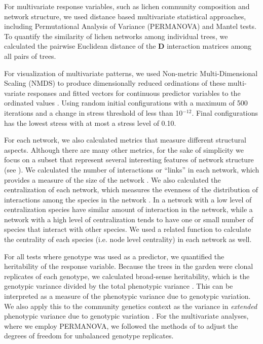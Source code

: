 \documentclass[11pt,twocolumn,twoside,lineno]{pnas-new}
\begin{document}
{For multivariate response variables, such as lichen community
composition and network structure, we used distance based multivariate
statistical approaches, including Permutational Analysis of Variance
(PERMANOVA) and Mantel tests. To quantify the similarity of lichen
networks among individual trees, we calculated the pairwise Euclidean
distance of the $\mathbf{D}$ interaction matrices among all pairs of
trees.

For visualization of multivariate patterns, we used Non-metric
Multi-Dimensional Scaling (NMDS) \cite{ecodist} to produce
dimensionally reduced ordinations of these multi-variate responses and
fitted vectors for continuous predictor variables to the ordinated
values \cite{vegan}. Using random initial configurations with a
maximum of 500 iterations and a change in stress threshold of less
than 10$^{-12}$. Final configurations has the lowest stress with at
most a stress level of 0.10.

For each network, we also calculated metrics that measure different
structural aspects. Although there are many other metrics, for the
sake of simplicity we focus on a subset that represent several
interesting features of network structure (see \citep{Lau2017a}). We
calculated the number of interactions or ``links'' in each network,
which provides a measure of the size of the network \citep{Lau2015a,
  Borrett2014EnaR:Analysis}. We also calculated the centralization of
each network, which measures the evenness of the distribution of
interactions among the species in the network \cite{sna}. In a network
with a low level of centralization species have similar amount of
interaction in the network, while a network with a high level of
centralization tends to have one or small number of species that
interact with other species. We used a related function to calculate
the centrality of each species (i.e. node level centrality) in each
network as well.

For all tests where genotype was used as a predictor, we quantified
the heritability of the response variable. Because the trees in the
garden were clonal replicates of each genotype, we calculated
broad-sense heritability, which is the genotypic variance divided by
the total phenotypic variance \cite{Conner2004ATextbook}. This can be
interpreted as a measure of the phenotypic variance due to genotypic
variation. We also apply this to the community genetics context as the
variance in \textit{extended} phenotypic variance due to genotypic
variation \cite{DawkinsTheGene}. For the
multivariate analyses, where we employ PERMANOVA, we followed the
methods of \citep{Shuster2006COMMUNITYSTRUCTURE} to adjust the degrees of freedom for
unbalanced genotype replicates.

}
\end{document}
